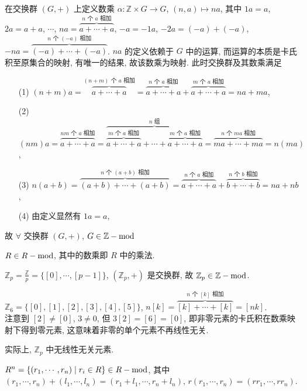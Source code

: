 \documentclass{note}
\begin{document}
\begin{eg}
    在交换群 $(G,+)$ 上定义数乘 $\alpha:\mathbb{Z}\times G\rightarrow G$, $(n,a)\mapsto na$, 其中 $1a=a$, $2a=a+a$, $\cdots$, $na=\overbrace{a+\cdots+a}^{\text{$n$ 个 $a$ 相加}}$, $-a=-1a$, $-2a=(-a)+(-a)$, $-na=\overbrace{(-a)+\cdots+(-a)}^{\text{$n$ 个 $(-a)$ 相加}}$. $na$ 的定义依赖于 $G$ 中的运算, 而运算的本质是卡氏积至原集合的映射, 有唯一的结果, 故该数乘为映射. 此时交换群及其数乘满足
    \begin{itemize}
        \item[(1)] $(n+m)a=\overbrace{a+\cdots+a}^{\text{$(n+m)$ 个 $a$ 相加}}=\overbrace{a+\cdots+a}^{\text{$n$ 个 $a$ 相加}}+\overbrace{a+\cdots+a}^{\text{$m$ 个 $a$ 相加}}=na+ma$,
        \item[(2)] $(nm)a=\overbrace{a+\cdots+a}^{\text{$nm$ 个 $a$ 相加}}=\overbrace{\overbrace{a+\cdots+a}^{\text{$m$ 个 $a$ 相加}}+\cdots+\overbrace{a+\cdots+a}^{\text{$m$ 个 $a$ 相加}}}^{\text{$n$ 组}}=\overbrace{ma+\cdots+ma}^{\text{$n$ 个 $ma$ 相加}}=n(ma)$,
        \item[(3)] $n(a+b)=\overbrace{(a+b)+\cdots+(a+b)}^{\text{$n$ 个 $(a+b)$ 相加}}=\overbrace{a+\cdots+a}^{\text{$n$ 个 $a$ 相加}}+\overbrace{b+\cdots+b}^{\text{$n$ 个 $b$ 相加}}=na+nb$,
        \item[(4)] 由定义显然有 $1a=a$,
    \end{itemize}
    故 $\forall$ 交换群 $(G,+)$, $G\in\mathbb{Z}-\operatorname{mod}$
\end{eg}

\begin{eg}
    $R\in R-\operatorname{mod}$, 其中的数乘即 $R$ 中的乘法.
\end{eg}

\begin{eg}\label{module Zp}
    $\mathbb{Z}_p=\frac{\mathbb{Z}}{p}=\{[0],\cdots,[p-1]\}$, $(\mathbb{Z}_p,+)$ 是交换群, 故 $\mathbb{Z}_p\in\mathbb{Z}-\operatorname{mod}$.

    $\mathbb{Z}_6=\{[0],[1],[2],[3],[4],[5]\}$, $n[k]=\overbrace{[k]+\cdots+[k]}^{\text{$n$ 个 $[k]$ 相加}}=[nk]$.\\
    注意到 $[2]\neq[0]$, $3\neq 0$, 但 $3[2]=[6]=[0]$, 即非零元素的卡氏积在数乘映射下得到零元素, 这意味着非零的单个元素不再线性无关.

    实际上, $\mathbb{Z}_p$ 中无线性无关元素.
\end{eg}

\begin{eg}
    $R^n=\{(r_1,\cdots,r_n)\mid r_i\in R\}\in R-\operatorname{mod}$, 其中 $(r_1,\cdots,r_n)+(l_1,\cdots,l_n)=(r_1+l_1,\cdots,r_n+l_n)$, $r(r_1,\cdots,r_n)=(rr_1,\cdots,rr_n)$.
\end{eg}
\end{document}
